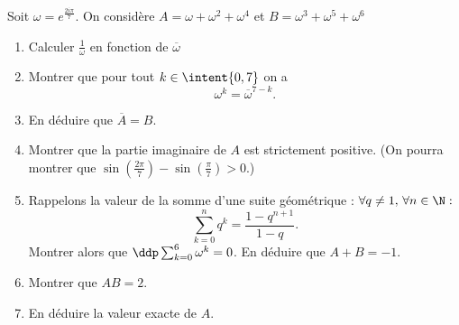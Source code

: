 



\begin{exercice}
Soit $\omega =e^{\frac{2i\pi}{7}}$. On considère $A=\omega+\omega^2 +\omega^4$ et $B =\omega^3+\omega^5 +\omega^6$

\begin{enumerate}
\item Calculer $\frac{1}{\omega}$ en fonction de $\overline{\omega}$
\item Montrer que pour tout $k\in \intent{0,7}$ on a 
$$\omega^k =\overline{\omega}^{7-k}.$$
\item En déduire que $\overline{A}=B$.
\item Montrer que la partie imaginaire de $A$ est strictement positive. (On pourra montrer que $\sin\left( \frac{2\pi}{7}\right)-\sin\left( \frac{\pi}{7}\right)>0$.)
\item  Rappelons la valeur de la  somme d'une suite géométrique : $\forall q\neq 1, \, \forall n\in \N : $
$$\sum_{k=0}^n q^k =\frac{1-q^{n+1}}{1-q}.$$
Montrer alors que $\ddp \sum_{k=0}^6 \omega^k =0$. En déduire que $A+B=-1$.
\item Montrer que $AB=2$. 

\item En déduire la valeur exacte de $A$.


\end{enumerate}
\end{exercice}
